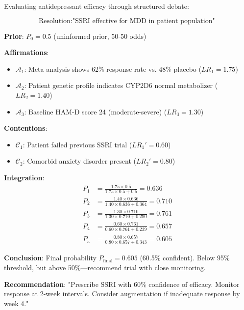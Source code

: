 \begin{example}
Evaluating antidepressant efficacy through structured debate:

\begin{equation}
\text{Resolution}: \text{"SSRI effective for MDD in patient population"}
\end{equation}

\textbf{Prior}: $P_0 = 0.5$ (uninformed prior, 50-50 odds)

\textbf{Affirmations}:
\begin{itemize}
\item $\mathcal{A}_1$: Meta-analysis shows 62\% response rate vs. 48\% placebo ($LR_1 = 1.75$)
\item $\mathcal{A}_2$: Patient genetic profile indicates CYP2D6 normal metabolizer ($LR_2 = 1.40$)
\item $\mathcal{A}_3$: Baseline HAM-D score 24 (moderate-severe) ($LR_3 = 1.30$)
\end{itemize}

\textbf{Contentions}:
\begin{itemize}
\item $\mathcal{C}_1$: Patient failed previous SSRI trial ($LR_1' = 0.60$)
\item $\mathcal{C}_2$: Comorbid anxiety disorder present ($LR_2' = 0.80$)
\end{itemize}

\textbf{Integration}:
\begin{align}
P_1 &= \frac{1.75 \times 0.5}{1.75 \times 0.5 + 0.5} = 0.636 \\
P_2 &= \frac{1.40 \times 0.636}{1.40 \times 0.636 + 0.364} = 0.710 \\
P_3 &= \frac{1.30 \times 0.710}{1.30 \times 0.710 + 0.290} = 0.761 \\
P_4 &= \frac{0.60 \times 0.761}{0.60 \times 0.761 + 0.239} = 0.657 \\
P_5 &= \frac{0.80 \times 0.657}{0.80 \times 0.657 + 0.343} = 0.605
\end{align}

\textbf{Conclusion}: Final probability $P_{\text{final}} = 0.605$ (60.5\% confident). Below 95\% threshold, but above 50\%—recommend trial with close monitoring.

\textbf{Recommendation}: "Prescribe SSRI with 60\% confidence of efficacy. Monitor response at 2-week intervals. Consider augmentation if inadequate response by week 4."
\end{example}

